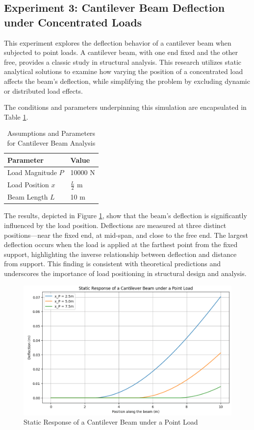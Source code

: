 \documentclass[conference]{IEEEtran}
\begin{document}
\subsection{Experiment 3: Cantilever Beam Deflection under Concentrated Loads}
This experiment explores the deflection behavior of a cantilever beam when subjected to point loads. A cantilever beam, with one end fixed and the other free, provides a classic study in structural analysis. This research utilizes static analytical solutions to examine how varying the position of a concentrated load affects the beam's deflection, while simplifying the problem by excluding dynamic or distributed load effects.

The conditions and parameters underpinning this simulation are encapsulated in Table \ref{tab5}.

\begin{table}[ht]
\centering
\caption{Assumptions and Parameters for Cantilever Beam Analysis}
\label{tab5}
\begin{tabular}{l l}
\hline
\textbf{Parameter} & \textbf{Value} \\
\hline
Load Magnitude \( P \) & 10000 N \\
Load Position \( x \) & \( \frac{L}{2} \) m \\
Beam Length \( L \) & 10 m \\
\hline
\end{tabular}
\end{table}

The results, depicted in Figure \ref{fig:cantilever_deflection}, show that the beam's deflection is significantly influenced by the load position. Deflections are measured at three distinct positions—near the fixed end, at mid-span, and close to the free end. The largest deflection occurs when the load is applied at the farthest point from the fixed support, highlighting the inverse relationship between deflection and distance from support. This finding is consistent with theoretical predictions and underscores the importance of load positioning in structural design and analysis.

\begin{figure}[ht]
\centering
\includegraphics[width=0.88\linewidth]{6.png}
\caption{Static Response of a Cantilever Beam under a Point Load}
\label{fig:cantilever_deflection}
\end{figure}
\end{document}
